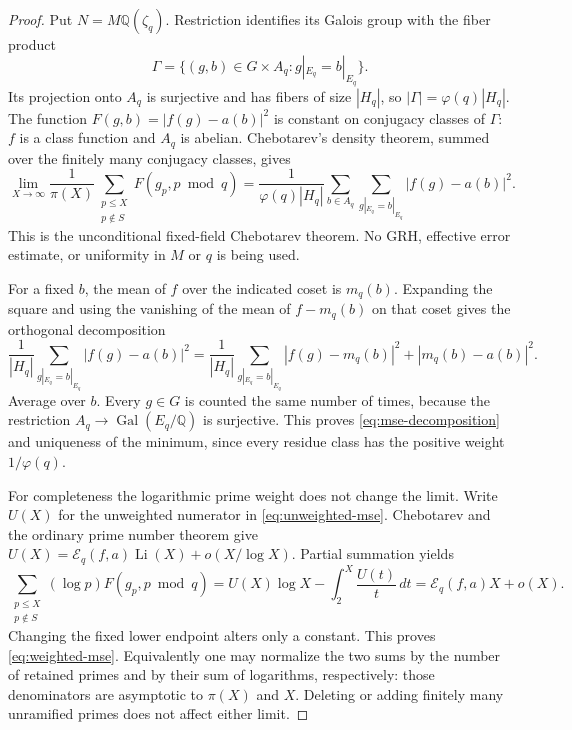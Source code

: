 \begin{proof}
Put $N=M\mathbb Q(\zeta_q)$. Restriction identifies its Galois group with
the fiber product
\[
 \Gamma=\{(g,b)\in G\times A_q:
                  g|_{E_q}=b|_{E_q}\}.
\]
Its projection onto $A_q$ is surjective and has fibers of size $|H_q|$,
so $|\Gamma|=\varphi(q)|H_q|$. The function
$F(g,b)=|f(g)-a(b)|^2$ is constant on conjugacy classes of $\Gamma$:
$f$ is a class function and $A_q$ is abelian. Chebotarev's density theorem,
summed over the finitely many conjugacy classes, gives
\begin{equation}\label{eq:fiber-product-average}
 \lim_{X\to\infty}\frac1{\pi(X)}
    \sum_{\substack{p\le X\\p\notin S}}F(g_p,p\bmod q)
 =\frac1{\varphi(q)|H_q|}
    \sum_{b\in A_q}
    \sum_{g|_{E_q}=b|_{E_q}}|f(g)-a(b)|^2.
\end{equation}
This is the unconditional fixed-field Chebotarev theorem. No GRH, effective
error estimate, or uniformity in $M$ or $q$ is being used.

For a fixed $b$, the mean of $f$ over the indicated coset is $m_q(b)$.
Expanding the square and using the vanishing of the mean of $f-m_q(b)$
on that coset gives the orthogonal decomposition
\[
 \frac1{|H_q|}\sum_{g|_{E_q}=b|_{E_q}}|f(g)-a(b)|^2
 =\frac1{|H_q|}\sum_{g|_{E_q}=b|_{E_q}}|f(g)-m_q(b)|^2
      +|m_q(b)-a(b)|^2.
\]
Average over $b$. Every $g\in G$ is counted the same number of times,
because the restriction $A_q\to\operatorname{Gal}(E_q/\mathbb Q)$ is
surjective. This proves \eqref{eq:mse-decomposition} and uniqueness of the
minimum, since every residue class has the positive weight
$1/\varphi(q)$.

For completeness the logarithmic prime weight does not change the limit.
Write $U(X)$ for the unweighted numerator in
\eqref{eq:unweighted-mse}. Chebotarev and the ordinary prime number theorem
give
$U(X)=\mathcal E_q(f,a)\operatorname{Li}(X)+o(X/\log X)$.
Partial summation yields
\[
 \sum_{\substack{p\le X\\p\notin S}}(\log p)F(g_p,p\bmod q)
 =U(X)\log X-\int_2^X\frac{U(t)}t\,dt
 =\mathcal E_q(f,a)X+o(X).
\]
Changing the fixed lower endpoint alters only a constant. This proves
\eqref{eq:weighted-mse}. Equivalently one may normalize the two sums by
the number of retained primes and by their sum of logarithms, respectively:
those denominators are asymptotic to $\pi(X)$ and $X$. Deleting or adding
finitely many unramified primes does not affect either limit.


\end{proof}
